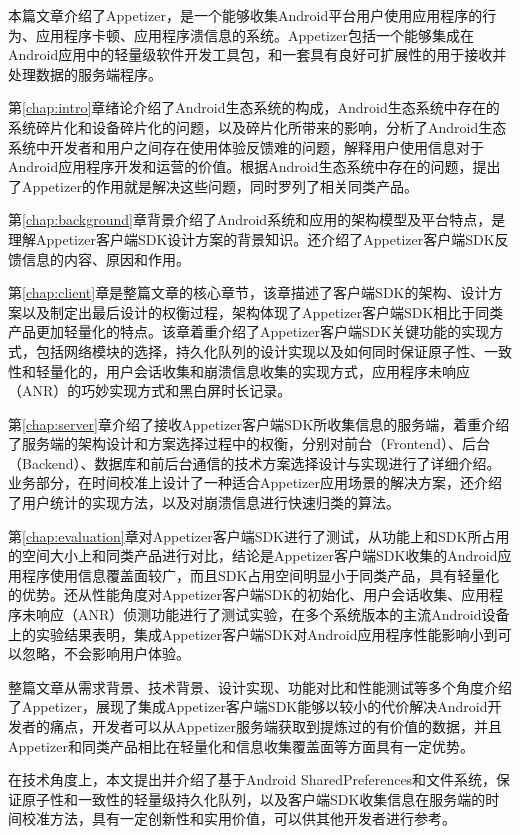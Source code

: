 
\begin{summary}

本篇文章介绍了Appetizer，是一个能够收集Android平台用户使用应用程序的行为、应用程序卡顿、应用程序溃信息的系统。Appetizer包括一个能够集成在Android应用中的轻量级软件开发工具包，和一套具有良好可扩展性的用于接收并处理数据的服务端程序。

第\ref{chap:intro}章绪论介绍了Android生态系统的构成，Android生态系统中存在的系统碎片化和设备碎片化的问题，以及碎片化所带来的影响，分析了Android生态系统中开发者和用户之间存在使用体验反馈难的问题，解释用户使用信息对于Android应用程序开发和运营的价值。根据Android生态系统中存在的问题，提出了Appetizer的作用就是解决这些问题，同时罗列了相关同类产品。

第\ref{chap:background}章背景介绍了Android系统和应用的架构模型及平台特点，是理解Appetizer客户端SDK设计方案的背景知识。还介绍了Appetizer客户端SDK反馈信息的内容、原因和作用。

第\ref{chap:client}章是整篇文章的核心章节，该章描述了客户端SDK的架构、设计方案以及制定出最后设计的权衡过程，架构体现了Appetizer客户端SDK相比于同类产品更加轻量化的特点。该章着重介绍了Appetizer客户端SDK关键功能的实现方式，包括网络模块的选择，持久化队列的设计实现以及如何同时保证原子性、一致性和轻量化的，用户会话收集和崩溃信息收集的实现方式，应用程序未响应（ANR）的巧妙实现方式和黑白屏时长记录。

第\ref{chap:server}章介绍了接收Appetizer客户端SDK所收集信息的服务端，着重介绍了服务端的架构设计和方案选择过程中的权衡，分别对前台（Frontend）、后台（Backend）、数据库和前后台通信的技术方案选择设计与实现进行了详细介绍。业务部分，在时间校准上设计了一种适合Appetizer应用场景的解决方案，还介绍了用户统计的实现方法，以及对崩溃信息进行快速归类的算法。

第\ref{chap:evaluation}章对Appetizer客户端SDK进行了测试，从功能上和SDK所占用的空间大小上和同类产品进行对比，结论是Appetizer客户端SDK收集的Android应用程序使用信息覆盖面较广，而且SDK占用空间明显小于同类产品，具有轻量化的优势。还从性能角度对Appetizer客户端SDK的初始化、用户会话收集、应用程序未响应（ANR）侦测功能进行了测试实验，在多个系统版本的主流Android设备上的实验结果表明，集成Appetizer客户端SDK对Android应用程序性能影响小到可以忽略，不会影响用户体验。

整篇文章从需求背景、技术背景、设计实现、功能对比和性能测试等多个角度介绍了Appetizer，展现了集成Appetizer客户端SDK能够以较小的代价解决Android开发者的痛点，开发者可以从Appetizer服务端获取到提炼过的有价值的数据，并且Appetizer和同类产品相比在轻量化和信息收集覆盖面等方面具有一定优势。

在技术角度上，本文提出并介绍了基于Android SharedPreferences和文件系统，保证原子性和一致性的轻量级持久化队列，以及客户端SDK收集信息在服务端的时间校准方法，具有一定创新性和实用价值，可以供其他开发者进行参考。

\end{summary}
